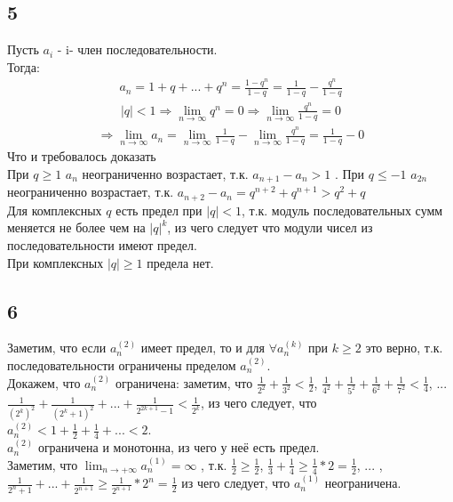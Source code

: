 		\subsection{5}
		Пусть $a_i$ - i- член последовательности.\\
		Тогда:
		\begin{gather*}
		a_n = 1 + q + ... + q^n = \frac{1 - q^n}{1 - q} = \frac{1}{1-q} - \frac{q^n}{1-q}
		\end{gather*}
		\begin{gather*}
		|q| < 1 \Longrightarrow \lim_{n\to\infty} q^n = 0 \Longrightarrow \lim_{n\to\infty} \frac{q^n}{1-q} = 0 
		\end{gather*}
		\begin{gather*}
		\Longrightarrow \lim_{n\to\infty} a_n = \lim_{n\to\infty} \frac{1}{1-q} - \lim_{n\to\infty} \frac{q^n}{1-q} = \frac{1}{1-q} - 0
		\end{gather*}
		Что и требовалось доказать \\
		При $q \geq 1$ $a_n$ неограниченно возрастает, т.к. $a_{n+1} - a_{n} > 1$ . При $q \leq -1$ $a_{2n}$ неограниченно возрастает, т.к. $a_{n+2} - a_{n} = q^{n+2} + q^{n+1} > q^2 + q$\\
		Для комплексных $q$ есть предел при $|q| < 1$, т.к. модуль последовательных сумм меняется не более чем на $|q|^k$, из чего следует что модули чисел из последовательности имеют предел.\\
		При комплексных $|q| \geq 1$ предела нет.
		
		\subsection{6}
		Заметим, что если $a_n^{(2)}$ имеет предел, то и для $\forall a_n^{(k)}$ при $k \geq 2$ это верно, т.к. последовательности ограничены пределом $a_n^{(2)}$.\\
		Докажем, что $a_n^{(2)}$ ограничена: заметим, что $\frac{1}{2^2} + \frac{1}{3^2} < \frac{1}{2}$, $\frac{1}{4^2} + \frac{1}{5^2} + \frac{1}{6^2} + \frac{1}{7^2} < \frac{1}{4}$, ... $\frac{1}{{(2^k)}^2} + \frac{1}{(2^k + 1)^2} + ... + \frac{1}{2^{2k+1} - 1} < \frac{1}{2^k}$, из чего следует, что $a_n^{(2)} < 1 + \frac{1}{2} + \frac{1}{4} + ... < 2$.\\
		$a_n^{(2)}$ ограничена и монотонна, из чего у неё есть предел.\\
		Заметим, что $\lim_{n \to +\infty} a_n^{(1)} = \infty$ , т.к. $\frac{1}{2} \geq \frac{1}{2}$, $\frac{1}{3} + \frac{1}{4} \geq \frac{1}{4} * 2 = \frac{1}{2}$, ... , $\frac{1}{2^n + 1} + ... + \frac{1}{2^{n+1}} \geq \frac{1}{2^{n+1}} * 2^{n} = \frac{1}{2}$ из чего следует, что $a_n^{(1)}$ неограничена.
		
